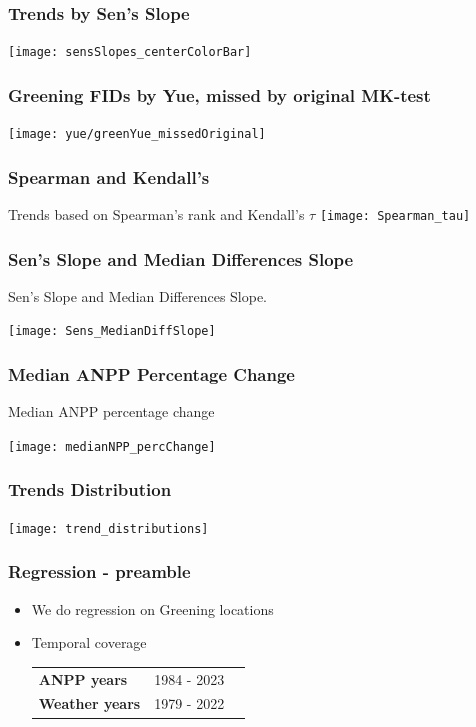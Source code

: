 \documentclass[serif, xcolor={dvipsnames}]{beamer} %
\begin{document}
\begin{frame}
\frametitle{Trends by Sen's Slope}
\begin{center}
\texttt{[image: sensSlopes\_centerColorBar]}
\end{center}
\end{frame}
\begin{frame}
\frametitle{Greening FIDs by Yue, missed by original MK-test}
\begin{center}
\texttt{[image: yue/greenYue\_missedOriginal]}
\end{center}
\end{frame}
\begin{frame}
\frametitle{Spearman and Kendall's}
Trends based on Spearman's rank and Kendall's $\tau$
\centering
\texttt{[image: Spearman\_tau]}
\end{frame}
\begin{frame}
\frametitle{Sen's Slope and Median Differences Slope}
Sen's Slope and Median Differences Slope.
\begin{center}
\texttt{[image: Sens\_MedianDiffSlope]}
\end{center}
\end{frame}
\begin{frame}
\frametitle{Median ANPP Percentage Change}
Median ANPP percentage change
\begin{center}
\texttt{[image: medianNPP\_percChange]}
\end{center}
\end{frame}
\begin{frame}
\frametitle{Trends Distribution}
\begin{center}
\texttt{[image: trend\_distributions]}
\end{center}
\end{frame}
\begin{frame}
\frametitle{Regression - preamble}
\begin{itemize}[<+->]
\item We do regression on Greening locations
\item Temporal coverage
\begin{table}[!ht]
\centering
\captionsetup{singlelinecheck=false, format=hang}
\label{tab:NPPWeatherYears}
\begin{tabular}{lll}
\bottomrule
\rowcolor{shadecolor} \textbf{ANPP years} &  1984 - 2023   \\ 
\textbf{Weather years}  & 1979 - 2022 \\
\toprule
\end{tabular}
\end{table}
\end{itemize}
\end{frame}
\end{document}
